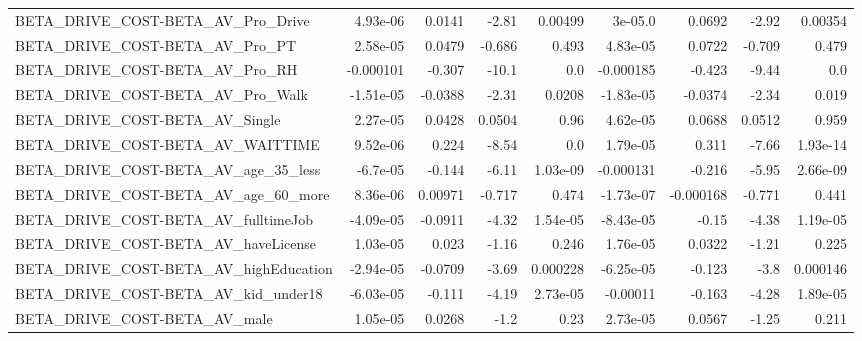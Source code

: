 \begin{tabular}{lrrrrrrrr}
BETA\_DRIVE\_COST-BETA\_AV\_Pro\_Drive                  &    4.93e-06 &       0.0141 &     -2.81 &  0.00499 &    3e-05.0 &      0.0692 &        -2.92 &       0.00354 \\
BETA\_DRIVE\_COST-BETA\_AV\_Pro\_PT                     &    2.58e-05 &       0.0479 &    -0.686 &    0.493 &   4.83e-05 &      0.0722 &       -0.709 &         0.479 \\
BETA\_DRIVE\_COST-BETA\_AV\_Pro\_RH                     &   -0.000101 &       -0.307 &     -10.1 &      0.0 &  -0.000185 &      -0.423 &        -9.44 &           0.0 \\
BETA\_DRIVE\_COST-BETA\_AV\_Pro\_Walk                   &   -1.51e-05 &      -0.0388 &     -2.31 &   0.0208 &  -1.83e-05 &     -0.0374 &        -2.34 &         0.019 \\
BETA\_DRIVE\_COST-BETA\_AV\_Single                     &    2.27e-05 &       0.0428 &    0.0504 &     0.96 &   4.62e-05 &      0.0688 &       0.0512 &         0.959 \\
BETA\_DRIVE\_COST-BETA\_AV\_WAITTIME                   &    9.52e-06 &        0.224 &     -8.54 &      0.0 &   1.79e-05 &       0.311 &        -7.66 &      1.93e-14 \\
BETA\_DRIVE\_COST-BETA\_AV\_age\_35\_less                &    -6.7e-05 &       -0.144 &     -6.11 & 1.03e-09 &  -0.000131 &      -0.216 &        -5.95 &      2.66e-09 \\
BETA\_DRIVE\_COST-BETA\_AV\_age\_60\_more                &    8.36e-06 &      0.00971 &    -0.717 &    0.474 &  -1.73e-07 &   -0.000168 &       -0.771 &         0.441 \\
BETA\_DRIVE\_COST-BETA\_AV\_fulltimeJob                &   -4.09e-05 &      -0.0911 &     -4.32 & 1.54e-05 &  -8.43e-05 &       -0.15 &        -4.38 &      1.19e-05 \\
BETA\_DRIVE\_COST-BETA\_AV\_haveLicense                &    1.03e-05 &        0.023 &     -1.16 &    0.246 &   1.76e-05 &      0.0322 &        -1.21 &         0.225 \\
BETA\_DRIVE\_COST-BETA\_AV\_highEducation              &   -2.94e-05 &      -0.0709 &     -3.69 & 0.000228 &  -6.25e-05 &      -0.123 &         -3.8 &      0.000146 \\
BETA\_DRIVE\_COST-BETA\_AV\_kid\_under18                &   -6.03e-05 &       -0.111 &     -4.19 & 2.73e-05 &   -0.00011 &      -0.163 &        -4.28 &      1.89e-05 \\
BETA\_DRIVE\_COST-BETA\_AV\_male                       &    1.05e-05 &       0.0268 &      -1.2 &     0.23 &   2.73e-05 &      0.0567 &        -1.25 &         0.211 \\

\end{tabular}
